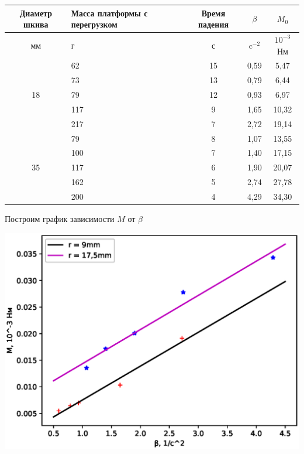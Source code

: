 \documentclass[a4paper, 12pt]{article}
\begin{document}
\begin{center}
\begin{tabular}{|c|p{4cm}|c|c|c|}
\hline
Диаметр шкива & Масса платформы с перегрузком & Время падения & $\beta$  & $M_0$       \\ \hline
мм            & г                             & с             & c$^{-2}$ & $10^{-3}$Нм \\ \hline
              & 62                            & 15            & 0,59     & 5,47        \\ \cline{2-5} 
              & 73                            & 13            & 0,79     & 6,44        \\ \cline{2-5} 
18            & 79                            & 12            & 0,93     & 6,97        \\ \cline{2-5} 
              & 117                           & 9             & 1,65     & 10,32       \\ \cline{2-5} 
              & 217                           & 7             & 2,72     & 19,14       \\ \hline \hline
              & 79                            & 8             & 1,07     & 13,55       \\ \cline{2-5} 
              & 100                           & 7             & 1,40     & 17,15       \\ \cline{2-5} 
35            & 117                           & 6             & 1,90     & 20,07       \\ \cline{2-5} 
              & 162                           & 5             & 2,74     & 27,78       \\ \cline{2-5} 
              & 200                           & 4             & 4,29     & 34,30       \\ \hline
\end{tabular}
\end{center}

\newpage

Построим график зависимости $M$ от $\beta$

\includegraphics[scale = 0.7]{Plot.eps}
\end{document}
